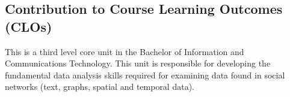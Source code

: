\documentclass{uws_learning_guide}
\begin{document}
\subsection{Contribution to Course Learning Outcomes (CLOs)}


This is a third level core unit in the Bachelor of Information and
Communications Technology. This unit is responsible for developing the
fundamental data analysis skills required for examining data found in
social networks (text, graphs, spatial and temporal data).
 







\end{document}

